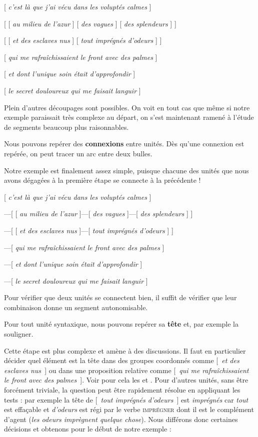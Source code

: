 \ea{}
[ \textit{c’est là que j’ai vécu dans les voluptés calmes} ]

[ [ \textit{au milieu de l’azur} ] [ \textit{des vagues} ] [ \textit{des splendeurs} ] ]

[ [ \textit{et des esclaves nus} ] [ \textit{tout imprégnés d’odeurs} ] ]

[ \textit{qui me rafraîchissaient le front avec des palmes} ]

[ \textit{et dont l’unique soin était d’approfondir} ]

[ \textit{le secret douloureux qui me faisait languir} ]
\z

Plein d’autres découpages sont possibles. On voit en tout cas que même si notre exemple paraissait très complexe au départ, on s’est maintenant ramené à l’étude de segments beaucoup plus raisonnables.

\begin{tblsframed}{}
\noindent Nous pouvons repérer des \textbf{connexions} entre unités. Dès qu’une connexion est repérée, on peut tracer un arc entre deux bulles.
\end{tblsframed}

Notre exemple est finalement assez simple, puisque chacune des unités que nous avons dégagées à la première étape se connecte à la précédente !

\ea{}
[ \textit{c’est là que j’ai vécu dans les voluptés calmes} ]

—[ [ \textit{au milieu de l’azur} ]—[ \textit{des vagues} ]—[ \textit{des splendeurs} ] ]

—[ [ \textit{et des esclaves nus} ]—[ \textit{tout imprégnés d’odeurs} ] ]

—[ \textit{qui me rafraîchissaient le front avec des palmes} ]

—[ \textit{et dont l’unique soin était d’approfondir} ]

—[ \textit{le secret douloureux qui me faisait languir} ]
\z

Pour vérifier que deux unités se connectent bien, il suffit de vérifier que leur combinaison donne un segment autonomisable.

\begin{tblsframed}{}
\noindent Pour tout unité syntaxique, nous pouvons repérer sa \textbf{tête} et, par exemple la souligner.
\end{tblsframed}

Cette étape est plus complexe et amène à des discussions. Il faut en particulier décider quel élément est la tête dans des groupes coordonnés comme [~\textit{et des esclaves nus~}] ou dans une proposition relative comme [~\textit{qui me rafraîchissaient le front avec des palmes~}]. Voir pour cela les   et . Pour d’autres unités, sans être forcément triviale, la question peut être rapidement résolue en appliquant les tests : par exemple la tête de [~\textit{tout imprégnés d’odeurs~}] est \textit{imprégnés} car \textit{tout} est effaçable et \textit{d’odeurs} est régi par le verbe \textsc{imprégner} dont il est le complément d’agent (\textit{les odeurs imprègnent quelque chose}). Nous différons donc certaines décisions et obtenons pour le début de notre exemple :

